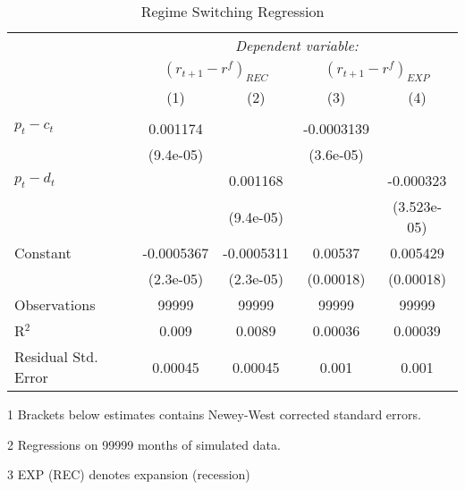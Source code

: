 \begin{table}[H]
\centering   
  \caption{Regime Switching Regression}           
  \label{tab:RSregress}     
  \begin{threeparttable}
\begin{tabular}{@{\hspace{5pt}}l@{\hspace{5pt}}cccc} 
\toprule 
 & \multicolumn{4}{c}{\textit{Dependent variable:}} \\ 
 & \multicolumn{2}{c}{$\left(r_{t+1}-r^f\right)_{REC}$} & \multicolumn{2}{c}{$\left(r_{t+1}-r^f\right)_{EXP}$} \\ 
 \cmidrule(rr){2-5}
 & (1)   &   (2) & (3) & (4) \\ 
\midrule  
\\[-2.1ex] $ p_t - c_t $ & 0.001174&  &-0.0003139   & \\ 
  & (9.4e-05) & &(3.6e-05) & \\ 
 \addlinespace 
 $p_t - d_t$ &  & 0.001168 & &-0.000323 \\
 & & (9.4e-05) & &(3.523e-05) \\
 \addlinespace 
 Constant &-0.0005367 &-0.0005311 &0.00537 &0.005429 \\ 
  &(2.3e-05) &(2.3e-05) &(0.00018) &(0.00018) \\ 
 \addlinespace 
\midrule  
Observations & 99999 & 99999 & 99999 &99999\\ 
R$^{2}$ &0.009 & 0.0089 & 0.00036 &0.00039\\ 
Residual Std. Error &0.00045 & 0.00045 &0.001 & 0.001  \\ 
\bottomrule 
\end{tabular} 
\begin{tablenotes}
\footnotesize{
\item[1] Brackets below estimates contains Newey-West corrected standard errors. 
\item[2] Regressions on 99999 months of simulated data.
\item[3] EXP (REC) denotes expansion (recession)
}
\end{tablenotes}
\end{threeparttable}
\end{table} 
